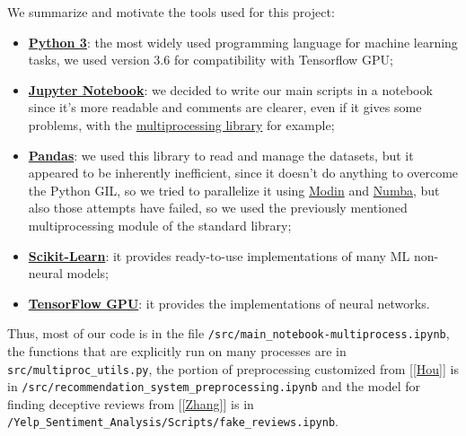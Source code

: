 We summarize and motivate the tools used for this project:
\begin{itemize}
	\item \textbf{\href{https://www.python.org/}{Python 3}}: the most widely used programming language for machine learning tasks, we used version 3.6 for compatibility with Tensorflow GPU;
	\item \textbf{\href{https://jupyter.org/}{Jupyter Notebook}}: we decided to write our main scripts in a notebook since it's more readable and comments are clearer, even if it gives some problems, with the \href{https://docs.python.org/3.6/library/multiprocessing.html}{multiprocessing library} for example;
	\item \textbf{\href{http://pandas.pydata.org}{Pandas}}: we used this library to read and manage the datasets, but it appeared to be inherently inefficient, since it doesn't do anything to overcome the Python GIL, so we tried to parallelize it using \href{https://modin.readthedocs.io/en/latest/index.html}{Modin} and \href{https://numba.pydata.org/}{Numba}, but also those attempts have failed, so we used the previously mentioned multiprocessing module of the standard library;
	\item \textbf{\href{http://scikit-learn.org}{Scikit-Learn}}: it provides ready-to-use implementations of many ML non-neural models;
	\item \textbf{\href{https://www.tensorflow.org/}{TensorFlow GPU}}: it provides the implementations of neural networks.
\end{itemize}

Thus, most of our code is in the file \texttt{/src/main\_notebook-multiprocess.ipynb}, the functions that are explicitly run on many processes are in \texttt{src/multiproc\_utils.py}, the portion of preprocessing customized from [\ref{Hou}] is in \texttt{/src/recommendation\_system\_preprocessing.ipynb} and the model for finding deceptive reviews from [\ref{Zhang}] is in \texttt{/Yelp\_Sentiment\_Analysis/Scripts/fake\_reviews.ipynb}.
